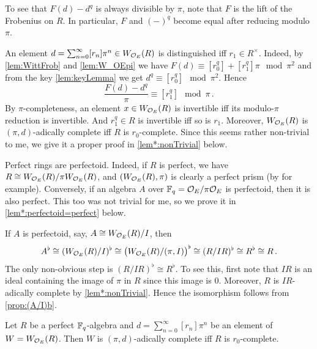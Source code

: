 \begin{rem}\label{rem:perfectoid}
	\begin{numerate}
		\item To see that $F(d)-d^q$ is always divisible by $\pi$, note that $F$ is the lift of the Frobenius on $R$. In particular, $F$ and $(-)^q$ become equal after reducing modulo $\pi$.
		\item An element $d=\sum_{n=0}^\infty[r_n]\pi^n\in W_{\mathcal{O}_E}(R)$ is distinguished iff $r_1\in R^\times$. Indeed, by \cref{lem:WittFrob} and \cref{lem:W_OEpi} we have $F(d)\equiv [r_0^q]+[r_1^q]\pi\mod \pi^2$ and from the key \cref{lem:keyLemma} we get $d^q\equiv [r_0^q]\mod \pi^2$. Hence
		\begin{equation*}
			\frac{F(d)-d^q}{\pi}\equiv [r_1^q]\mod \pi\,.
		\end{equation*}
		By $\pi$-completeness, an element $x\in W_{\mathcal{O}_E}(R)$ is invertible iff its modulo-$\pi$ reduction is invertible. And $r_1^q\in R$ is invertible iff so is $r_1$. Moreover, $W_{\mathcal{O}_E}(R)$ is $(\pi,d)$-adically complete iff $R$ is $r_0$-complete. Since this seems rather non-trivial to me, we give it a proper proof in \cref{lem*:nonTrivial} below.
		\item Perfect rings are perfectoid. Indeed, if $R$ is perfect, we have $R\cong W_{\mathcal{O}_E}(R)/\pi W_{\mathcal{O}_E}(R)$, and $(W_{\mathcal{O}_E}(R),\pi)$ is clearly a perfect prism (by  for example). Conversely, if an algebra $A$ over $\mathbb{F}_q=\mathcal{O}_E/\pi\mathcal{O}_E$ is perfectoid, then it is also perfect. This too was not trivial for me, so we prove it in \cref{lem*:perfectoid=perfect} below.
		\item If $A$ is perfectoid, say, $A\cong W_{\mathcal{O}_E}(R)/I$, then
		\begin{equation*}
			A^\flat\cong (W_{\mathcal{O}_E}(R)/I)^\flat\cong \big(W_{\mathcal{O}_E}(R)/(\pi,I)\big)^\flat\cong (R/IR)^\flat\cong R^\flat\cong R\,.
		\end{equation*}
		The only non-obvious step is $(R/IR)^\flat\cong R^\flat$. To see this, first note that $IR$ is an ideal containing the image of $\pi$ in $R$ since this image is $0$. Moreover, $R$ is $IR$-adically complete by \cref{lem*:nonTrivial}. Hence the isomorphism follows from \cref{prop:(A/I)b}.
	\end{numerate}
\end{rem}
\begin{lem*}\label{lem*:nonTrivial}
	Let $R$ be a perfect $\mathbb{F}_q$-algebra and $d=\sum_{n=0}^\infty[r_n]\pi^n$ be an element of $W=W_{\mathcal{O}_E}(R)$. Then $W$ is $(\pi,d)$-adically complete iff $R$ is $r_0$-complete.
\end{lem*}
